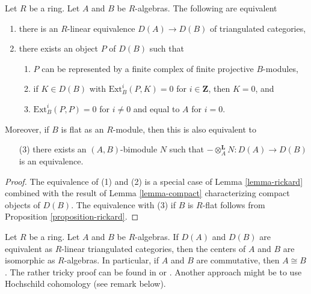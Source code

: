 \begin{lemma}
\label{lemma-rickard-rings}
Let $R$ be a ring.
Let $A$ and $B$ be $R$-algebras. The following are equivalent
\begin{enumerate}
\item there is an $R$-linear equivalence $D(A) \to D(B)$
of triangulated categories,
\item there exists an object $P$ of $D(B)$ such that
\begin{enumerate}
\item $P$ can be represented by a finite complex
of finite projective $B$-modules,
\item if $K \in D(B)$ with $\text{Ext}^i_B(P, K) = 0$ for
$i \in \mathbf{Z}$, then $K = 0$, and
\item $\text{Ext}^i_B(P, P) = 0$ for $i \not = 0$ and
equal to $A$ for $i= 0$.
\end{enumerate}
\end{enumerate}
Moreover, if $B$ is flat as an $R$-module, then this is also
equivalent to
\begin{enumerate}
\item[(3)] there exists an $(A, B)$-bimodule $N$ such that
$- \otimes_A^\mathbf{L} N : D(A) \to D(B)$ is an equivalence.
\end{enumerate}
\end{lemma}

\begin{proof}
The equivalence of (1) and (2) is a special case of
Lemma \ref{lemma-rickard} combined with the result of
Lemma \ref{lemma-compact} characterizing compact objects of $D(B)$.
The equivalence with (3) if $B$ is $R$-flat follows from
Proposition \ref{proposition-rickard}.
\end{proof}

\begin{remark}
\label{remark-centers}
Let $R$ be a ring. Let $A$ and $B$ be $R$-algebras.
If $D(A)$ and $D(B)$ are equivalent as $R$-linear triangulated
categories, then the centers of $A$ and $B$ are isomorphic
as $R$-algebras. In particular, if $A$ and $B$ are commutative,
then $A \cong B$. The rather tricky proof can be found in
\cite[Proposition 9.2]{Rickard} or \cite[Proposition 6.3.2]{KZ}.
Another approach might be to use Hochschild cohomology (see
remark below).
\end{remark}

